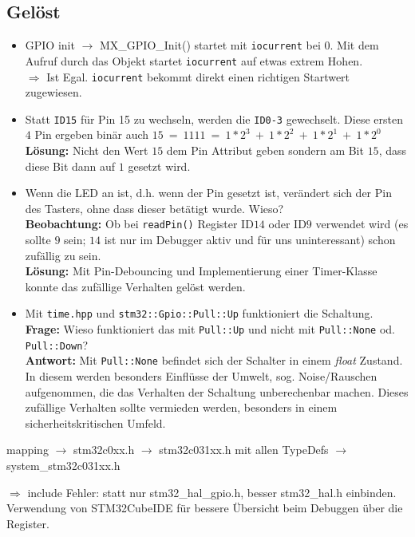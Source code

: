 \subsection*{Gelöst}
\begin{itemize}
	\item GPIO init $\rightarrow$ MX\_GPIO\_Init() startet mit \texttt{iocurrent} bei $0$. Mit dem Aufruf durch das Objekt startet \texttt{iocurrent} auf etwas extrem Hohen. \\ $\Longrightarrow$ Ist Egal. \texttt{iocurrent} bekommt direkt einen richtigen Startwert zugewiesen.
	\item Statt \texttt{ID15} für Pin 15 zu wechseln, werden die \texttt{ID0-3} gewechselt. Diese ersten $4$ Pin ergeben binär auch $15\ =\ 1111\ =\ 1*2^3\ +\ 1*2^2\ +\ 1*2^1\ +\ 1*2^0$ \\ \textbf{Lösung:} Nicht den Wert $15$ dem Pin Attribut geben sondern am Bit $15$, dass diese Bit dann auf $1$ gesetzt wird.
	\item Wenn die LED an ist, d.h. wenn der Pin gesetzt ist, verändert sich der Pin des Tasters, ohne dass dieser betätigt wurde. Wieso?\\ \textbf{Beobachtung:} Ob bei \texttt{readPin()} Register ID$14$ oder ID$9$ verwendet wird (es sollte $9$ sein; $14$ ist nur im Debugger aktiv und für uns uninteressant) schon zufällig zu sein.\\ \textbf{Lösung:} Mit Pin-Debouncing und Implementierung einer Timer-Klasse konnte das zufällige Verhalten gelöst werden. 
	\item Mit \texttt{time.hpp} und \texttt{stm32::Gpio::Pull::Up} funktioniert die Schaltung.\\ \textbf{Frage:} Wieso funktioniert das mit \texttt{Pull::Up} und nicht mit \texttt{Pull::None} od. \texttt{Pull::Down}?\\ \textbf{Antwort:} Mit \texttt{Pull::None} befindet sich der Schalter in einem \emph{float} Zustand. In diesem werden besonders Einflüsse der Umwelt, sog. Noise/Rauschen aufgenommen, die das Verhalten der Schaltung unberechenbar machen. Dieses zufällige Verhalten sollte vermieden werden, besonders in einem sicherheitskritischen Umfeld.
\end{itemize}

\vspace{3mm}

mapping $\rightarrow$ stm32c0xx.h $\rightarrow$ stm32c031xx.h mit allen TypeDefs $\rightarrow$ system\_stm32c031xx.h

$\Longrightarrow$ include Fehler: statt nur stm32\_hal\_gpio.h, besser stm32\_hal.h einbinden.
\\

Verwendung von STM32CubeIDE für bessere Übersicht beim Debuggen über die Register.
\\
